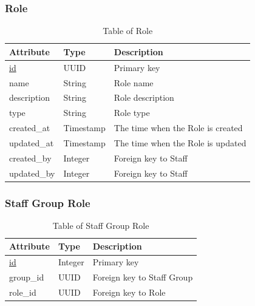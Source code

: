 \subsubsection{Role}
\begin{table}[H]
    \centering
    \begin{tabular}{|p{3cm}|p{2cm}|p{\dimexpr\textwidth-6.8cm}|} %
        \hline
        \rowcolor[HTML]{C0C0C0} 
        \textbf{Attribute} & \textbf{Type} & \textbf{Description} \\ \hline
        \underline{id} & UUID & Primary key \\ \hline
        name & String & Role name \\ \hline
        description & String & Role description \\ \hline
        type & String & Role type \\ \hline
        created\_at & Timestamp & The time when the Role is created \\ \hline
        updated\_at & Timestamp & The time when the Role is updated \\ \hline
        created\_by & Integer & Foreign key to Staff \\ \hline
        updated\_by & Integer & Foreign key to Staff \\ \hline
    \end{tabular}
    \caption{Table of Role}
    \label{tab:role-table}
\end{table}

\subsubsection{Staff Group Role}
\begin{table}[H]
    \centering
    \begin{tabular}{|p{3cm}|p{2cm}|p{\dimexpr\textwidth-6.8cm}|} %
        \hline
        \rowcolor[HTML]{C0C0C0} 
        \textbf{Attribute} & \textbf{Type} & \textbf{Description} \\ \hline
        \underline{id} & Integer & Primary key \\ \hline
        group\_id & UUID & Foreign key to Staff Group \\ \hline
        role\_id & UUID & Foreign key to Role \\ \hline
    \end{tabular}
    \caption{Table of Staff Group Role}
    \label{tab:staff-group-role-table}
\end{table}

